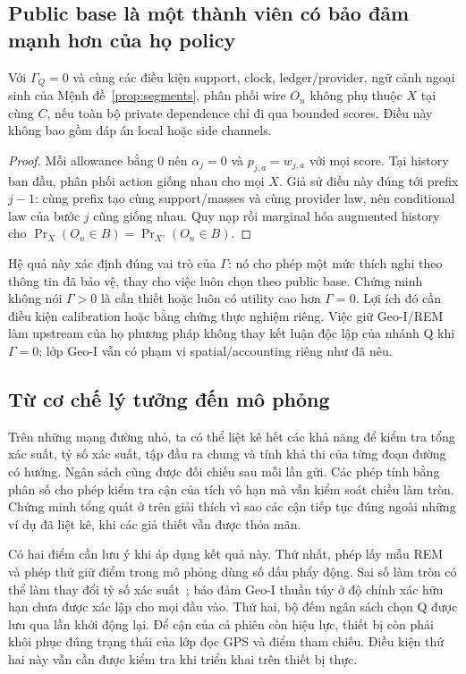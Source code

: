 \subsection{Public base là một thành viên có bảo đảm mạnh hơn của họ policy}
\begin{proposition}\label{prop:gamma-zero}
Với $\Gamma_Q=0$ và cùng các điều kiện support, clock, ledger/provider, ngữ cảnh ngoại sinh của
Mệnh đề~\ref{prop:segments}, phân phối wire $O_n$ không phụ thuộc $X$ tại cùng $C$, nếu toàn bộ
private dependence chỉ đi qua bounded scores. Điều này không bao gồm đáp án local hoặc side channels.
\end{proposition}
\begin{proof}
Mỗi allowance bằng 0 nên $\alpha_j=0$ và $p_{j,a}=w_{j,a}$ với mọi score. Tại history ban đầu,
phân phối action giống nhau cho mọi $X$. Giả sử điều này đúng tới prefix $j-1$: cùng prefix tạo
cùng support/masses và cùng provider law, nên conditional law của bước $j$ cũng giống nhau.
Quy nạp rồi marginal hóa augmented history cho $\Pr_X(O_n\in B)=\Pr_{X'}(O_n\in B)$.
\end{proof}

Hệ quả này xác định đúng vai trò của $\Gamma$: nó cho phép một mức thích nghi theo thông tin đã
bảo vệ, thay cho việc luôn chọn theo public base. Chứng minh không nói $\Gamma>0$ là cần thiết hoặc
luôn có utility cao hơn $\Gamma=0$. Lợi ích đó cần điều kiện calibration hoặc bằng chứng thực nghiệm
riêng. Việc giữ Geo-I/REM làm upstream của họ phương pháp không thay kết luận độc lập của nhánh
Q khi $\Gamma=0$; lớp Geo-I vẫn có phạm vi spatial/accounting riêng như đã nêu.

\subsection{Từ cơ chế lý tưởng đến mô phỏng}\label{sec:proof-implementation}

Trên những mạng đường nhỏ, ta có thể liệt kê hết các khả năng để kiểm tra tổng xác suất, tỷ số xác suất, tập đầu ra chung và tính khả thi của từng đoạn đường có hướng. Ngân sách cũng được đối chiếu sau mỗi lần gửi. Các phép tính bằng phân số cho phép kiểm tra cận của tích vô hạn mà vẫn kiểm soát chiều làm tròn. Chứng minh tổng quát ở trên giải thích vì sao các cận tiếp tục đúng ngoài những ví dụ đã liệt kê, khi các giả thiết vẫn được thỏa mãn.

Có hai điểm cần lưu ý khi áp dụng kết quả này. Thứ nhất, phép lấy mẫu REM và phép thử giữ điểm trong mô phỏng dùng số dấu phẩy động. Sai số làm tròn có thể làm thay đổi tỷ số xác suất~\cite{mironov}; bảo đảm Geo-I thuần túy ở độ chính xác hữu hạn chưa được xác lập cho mọi đầu vào. Thứ hai, bộ đếm ngân sách chọn Q được lưu qua lần khởi động lại. Để cận của cả phiên còn hiệu lực, thiết bị còn phải khôi phục đúng trạng thái của lớp đọc GPS và điểm tham chiếu. Điều kiện thứ hai này vẫn cần được kiểm tra khi triển khai trên thiết bị thực.
